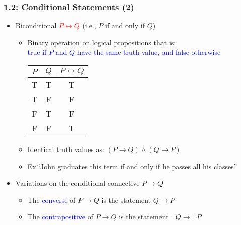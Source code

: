 \documentclass[10pt,english]{beamer}
\begin{document}
\begin{frame} \frametitle{1.2: Conditional Statements (2)}

\begin{itemize}

\item Biconditional \textcolor{red}{$P \leftrightarrow Q$} (i.e., $P$ if and only if $Q$)

\begin{itemize}
  \setlength\itemsep{1.5mm}
  \item Binary operation on logical propositions that is:\\ \hspace{2mm} \textcolor{blue}{true if $P$ and $Q$ have the same truth value, and false otherwise} \vspace{1mm} \\
   
  \begin{center}
  \begin{tabular}{|c|c|c|}
  \hline
  $P$ & $Q$ & $P \leftrightarrow Q$ \\
  \hline
  T & T & T \\
  T & F & F \\
  F & T & F \\
  F & F & T \\
  \hline
  \end{tabular}
  \end{center} 
  \vspace{1mm}

  \item Identical truth values as: $(P \rightarrow Q) \wedge (Q \rightarrow P)$
  
  \item Ex.``John graduates this term if and only if he passes all his classes''
  
\end{itemize}

\vspace{1mm}

\item Variations on the conditional connective $P \rightarrow Q$

\begin{itemize}
  \setlength\itemsep{2mm}
  \item The \textcolor{blue}{converse} of $P \rightarrow Q$ is the statement $Q \rightarrow P$
  \item The \textcolor{blue}{contrapositive} of $P \rightarrow Q$ is the statement $\neg Q \rightarrow \neg P$
\end{itemize}

\end{itemize}

\end{frame}
\end{document}
